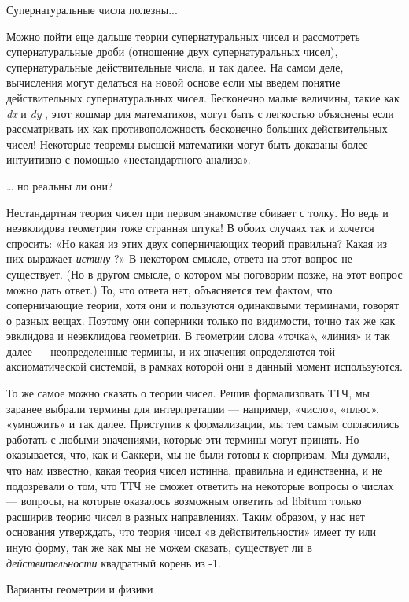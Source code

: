 \documentclass[../main.tex]{subfiles}
\begin{document}
Супернатуральные числа полезны...

Можно пойти еще дальше теории супернатуральных чисел и рассмотреть супернатуральные дроби (отношение двух супернатуральных чисел), супернатуральные действительные числа, и так далее. На самом деле, вычисления могут делаться на новой основе если мы введем понятие действительных супернатуральных чисел. Бесконечно малые величины, такие как \emph{dx} и \emph{dy} , этот кошмар для математиков, могут быть с легкостью объяснены если рассматривать их как противоположность бесконечно больших действительных чисел! Некоторые теоремы высшей математики могут быть доказаны более интуитивно с помощью «нестандартного анализа».

\ldots{} но реальны ли они?

Нестандартная теория чисел при первом знакомстве сбивает с толку. Но ведь и неэвклидова геометрия тоже странная штука! В обоих случаях так и хочется спросить: «Но какая из этих двух соперничающих теорий правильна? Какая из них выражает \emph{истину} ?» В некотором смысле, ответа на этот вопрос не существует. (Но в другом смысле, о котором мы поговорим позже, на этот вопрос можно дать ответ.) То, что ответа нет, объясняется тем фактом, что соперничающие теории, хотя они и пользуются одинаковыми терминами, говорят о разных вещах. Поэтому они соперники только по видимости, точно так же как эвклидова и неэвклидова геометрии. В геометрии слова «точка», «линия» и так далее --- неопределенные термины, и их значения определяются той аксиоматической системой, в рамках которой они в данный момент используются.

То же самое можно сказать о теории чисел. Решив формализовать ТТЧ, мы заранее выбрали термины для интерпретации --- например, «число», «плюс», «умножить» и так далее. Приступив к формализации, мы тем самым согласились работать с любыми значениями, которые эти термины могут принять. Но оказывается, что, как и Саккери, мы не были готовы к сюрпризам. Мы думали, что нам известно, какая теория чисел истинна, правильна и единственна, и не подозревали о том, что ТТЧ не сможет ответить на некоторые вопросы о числах --- вопросы, на которые оказалось возможным ответить ad libitum только расширив теорию чисел в разных направлениях. Таким образом, у нас нет основания утверждать, что теория чисел «в действительности» имеет ту или иную форму, так же как мы не можем сказать, существует ли в \emph{действительности} квадратный корень из -1.

Варианты геометрии и физики
\end{document}
